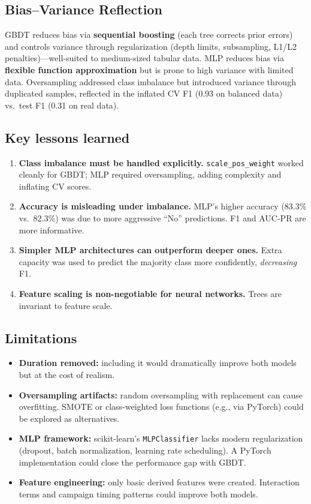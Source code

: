 \documentclass[11pt, a4paper]{article}
\begin{document}
\subsection{Bias--Variance Reflection}

GBDT reduces bias via \textbf{sequential boosting} (each tree corrects prior
errors) and controls variance through regularization (depth limits, subsampling,
L1/L2 penalties)---well-suited to medium-sized tabular data.
MLP reduces bias via \textbf{flexible function approximation} but is prone to
high variance with limited data. Oversampling addressed class imbalance but
introduced variance through duplicated samples, reflected in the inflated CV
F1 (0.93 on balanced data) vs.\ test F1 (0.31 on real data).

\subsection{Key lessons learned}

\begin{enumerate}[nosep]
    \item \textbf{Class imbalance must be handled explicitly.}
          \texttt{scale\_pos\_weight} worked cleanly for GBDT; MLP required
          oversampling, adding complexity and inflating CV scores.
    \item \textbf{Accuracy is misleading under imbalance.} MLP's higher
          accuracy (83.3\% vs.\ 82.3\%) was due to more aggressive ``No''
          predictions. F1 and AUC-PR are more informative.
    \item \textbf{Simpler MLP architectures can outperform deeper ones.}
          Extra capacity was used to predict the majority class more
          confidently, \emph{decreasing} F1.
    \item \textbf{Feature scaling is non-negotiable for neural networks.}
          Trees are invariant to feature scale.
\end{enumerate}

\subsection{Limitations}

\begin{itemize}[nosep]
    \item \textbf{Duration removed:} including it would dramatically improve
          both models but at the cost of realism.
    \item \textbf{Oversampling artifacts:} random oversampling with replacement
          can cause overfitting. SMOTE or class-weighted loss functions (e.g.,
          via PyTorch) could be explored as alternatives.
    \item \textbf{MLP framework:} scikit-learn's \texttt{MLPClassifier} lacks
          modern regularization (dropout, batch normalization, learning rate
          scheduling). A PyTorch implementation could close the performance
          gap with GBDT.
    \item \textbf{Feature engineering:} only basic derived features were
          created. Interaction terms and campaign timing patterns could improve
          both models.
\end{itemize}
\end{document}
